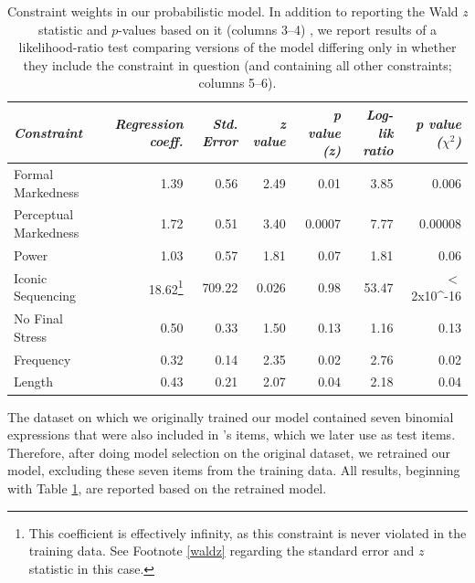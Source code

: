 \documentclass[authoryear]{elsarticle}
\begin{document}
\begin{table}[t]
\begin{minipage}[t]{\textwidth}


\renewcommand*\footnoterule{}


\centering
\begin{tabular}{ l  r  r  r  r r r }
\hline\hline
\emph{Constraint} & \emph{Regression coeff.} &\emph{Std. Error} & \emph{z value} & \emph{p value (z)} & \emph{Log-lik ratio} & \emph{p value ($\chi^{2}$)}\\\hline    
 Formal Markedness   & 1.39     & 0.56   & 2.49  & 0.01 & 3.85 & 0.006  \\ 
Perceptual Markedness   & 1.72     & 0.51  &  3.40 &  0.0007& 7.77 & 0.00008    \\ 
 Power &     1.03 &     0.57&    1.81 &  0.07& 1.81 & 0.06     \\
Iconic Sequencing  &    18.62\footnote{This coefficient is effectively infinity, as this constraint is never violated in the training data. See Footnote \ref{waldz} regarding the standard error and $z$ statistic in this case.} &   709.22  &  0.026 &  0.98&   53.47 & $<$2x10^{-16}    \\
 No Final Stress   &    0.50   &   0.33 &   1.50&   0.13 & 1.16 & 0.13      \\
 Frequency   &    0.32    &  0.14 &   2.35  & 0.02& 2.76 & 0.02     \\  
 Length  &    0.43  &    0.21 &   2.07 &  0.04& 2.18  & 0.04    \\  \hline
\end{tabular}
\end{minipage}
\caption{Constraint weights in our probabilistic model. In addition to reporting the Wald \emph{z} statistic and $p$-values based on it (columns 3--4) , we report results of a likelihood-ratio test comparing versions of the model differing only in whether they include the constraint in question (and containing all other constraints; columns 5--6).}\label{t:weights}

\end{table} 


The dataset on which we originally trained our model contained seven binomial expressions that were also included in \citeauthor{SiyanovaChanturia:2011ep}'s \citeyearpar{SiyanovaChanturia:2011ep} items, which we later use as test items. Therefore, after doing model selection on the original dataset, we retrained our model, excluding these seven items from the training data. All results, beginning with Table \ref{t:weights}, are reported based on the retrained model.
\end{document}
